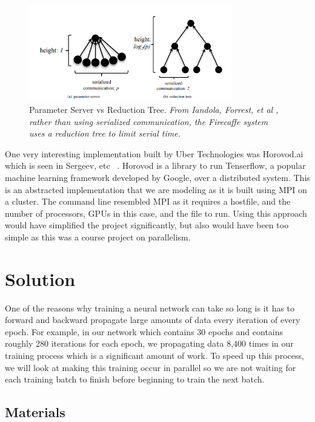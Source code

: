 \documentclass[11pt,twocolumn]{article}
\begin{document}
\begin{figure}[t]
    \centerline{
        \includegraphics[height=1.65in]{parmservsredtree.png}
    }
    \caption{
        \label{ParamvsReduc}  Parameter Server vs Reduction Tree.
        {\em From Iandola, Forrest, et al \cite{iandola2016firecaffe}, rather than using serialized communication, the Firecaffe system uses a reduction tree to limit serial time.} 
    }
\end{figure}

One very interesting implementation built by Uber Technologies was Horovod.ai which is seen in Sergeev, etc ~\cite{Horovod:journals/corr/abs-1802-05799}. Horovod is a library to run Tenserflow, a popular machine learning framework developed by Google, over a distributed system. This is an abstracted implementation that we are modeling as it is built using MPI on a cluster. The command line resembled MPI as it requires a hostfile, and the number of processors, GPUs in this case, and the file to run. Using this approach would have simplified the project significantly, but also would have been too simple as this was a course project on parallelism.

\section {Solution}\label{soln}
One of the reasons why training a neural network can take so long is it has to forward and backward propagate large amounts of data every iteration of every epoch. For example, in our network which contains 30 epochs and contains roughly 280 iterations for each epoch, we propagating data 8,400 times in our training process which is a significant amount of work. To speed up this process, we will look at making this training occur in parallel so we are not waiting for each training batch to finish before beginning to train the next batch.


\subsection{Materials}
\end{document}
